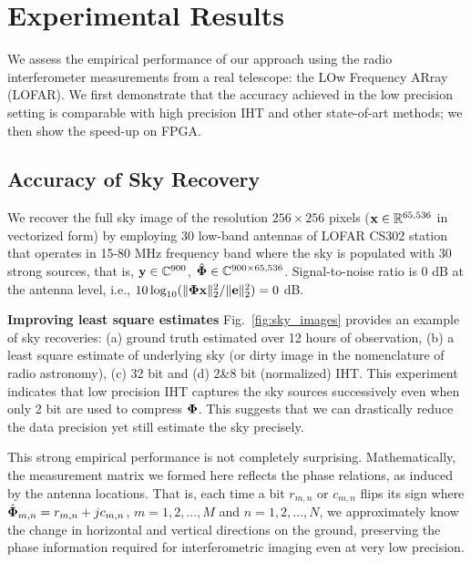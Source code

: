 \documentclass{article}
\begin{document}
{\vspace{-1em}
\section{Experimental Results}\label{section_experiments}
\vspace{-0.5em}

We assess the empirical performance of our approach using the radio interferometer measurements from a real telescope: the LOw Frequency ARray (LOFAR). We first demonstrate that the accuracy achieved in the low precision setting is comparable with high precision IHT and other state-of-art methods; we then show the speed-up on FPGA.

\vspace{-1em}
\subsection{Accuracy of Sky Recovery}
\vspace{-0.5em}

We recover the full sky image of the resolution $256\times 256$ pixels (${\bf x} \in \mathbb{R}^{65,536}$ in vectorized form) by employing 30 low-band antennas of LOFAR CS302 station that operates in 15-80 MHz frequency band where the sky is populated with 30 strong sources, that is, ${\bf y} \in \mathbb{C}^{900}$, $\hat{\bf \Phi} \in \mathbb{C}^{900\times 65,536}$. Signal-to-noise ratio is 0 dB at the antenna level, i.e., $10\log_{10}(\|{\bf \Phi x}\|_2^2/\|{\bf e}\|_2^2) = 0$ dB. 

\vspace{-0.5em}
{\bf Improving least square estimates}
Fig.~\ref{fig:sky_images} provides an example of sky recoveries: (a) ground truth estimated over 12 hours of observation, (b) a least square estimate of underlying sky (or dirty image in the nomenclature of radio astronomy), (c) 32 bit and (d) 2\&8 bit (normalized) IHT. This experiment indicates that low precision IHT captures the sky sources successively even when only 2 bit are used to compress ${\bf \Phi}$. This suggests that we can drastically reduce the data precision yet still estimate the sky precisely.
\vspace{-.1em}

This strong empirical performance is not completely surprising. Mathematically, the measurement matrix we formed here reflects the phase relations, as induced by the antenna locations.  That is, each time a bit $r_{m, n}$ or $c_{m, n}$ flips its sign where $\hat{\bf \Phi}_{m, n} = r_{m, n} +j c_{m,n}$, $m = {1, 2, ..., M}$ and $n = {1, 2, ..., N}$, we approximately know the change in horizontal and vertical directions on the ground, preserving the phase information required for interferometric imaging even at very low precision.

}
\end{document}
